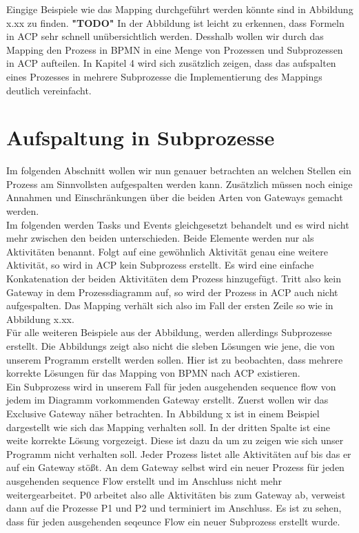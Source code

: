 Eingige Beispiele wie das Mapping durchgeführt werden könnte sind in Abbildung x.xx zu finden. \textbf{"TODO"}
In der Abbildung ist leicht zu erkennen, dass Formeln in ACP sehr schnell unübersichtlich werden. Desshalb wollen wir durch das Mapping den Prozess in BPMN in eine Menge von Prozessen und Subprozessen in ACP aufteilen. In Kapitel 4 wird sich zusätzlich zeigen, dass das aufspalten eines Prozesses in mehrere Subprozesse die Implementierung des Mappings deutlich vereinfacht.\\

\section {Aufspaltung in Subprozesse}
Im folgenden Abschnitt wollen wir nun genauer betrachten an welchen Stellen ein Prozess am Sinnvollsten aufgespalten werden kann. Zusätzlich müssen noch einige Annahmen und Einschränkungen über die beiden Arten von Gateways gemacht werden.\\
Im folgenden werden Tasks und Events gleichgesetzt behandelt und es wird nicht mehr zwischen den beiden unterschieden. Beide Elemente werden nur als Aktivitäten benannt. Folgt auf eine gewöhnlich Aktivität genau eine weitere Aktivität, so wird in ACP kein Subprozess erstellt. Es wird eine einfache Konkatenation der beiden Aktivitäten dem Prozess hinzugefügt. Tritt also kein Gateway in dem Prozessdiagramm auf, so wird der Prozess in ACP auch nicht aufgespalten. Das Mapping verhält sich also im Fall der ersten Zeile so wie in Abbildung x.xx.\\
Für alle weiteren Beispiele aus der Abbildung, werden allerdings Subprozesse erstellt. Die Abbildungs zeigt also nicht die sleben Lösungen wie jene, die von unserem Programm erstellt werden sollen. Hier ist zu beobachten, dass mehrere korrekte Lösungen für das Mapping von BPMN nach ACP existieren.\\
Ein Subprozess wird in unserem Fall für jeden ausgehenden sequence flow von jedem im Diagramm vorkommenden Gateway erstellt. Zuerst wollen wir das Exclusive Gateway näher betrachten. In Abbildung x ist in einem Beispiel dargestellt wie sich das Mapping verhalten soll. In der dritten Spalte ist eine weite korrekte Lösung vorgezeigt. Diese ist dazu da um zu zeigen wie sich unser Programm nicht verhalten soll. Jeder Prozess listet alle Aktivitäten auf bis das er auf ein Gateway stößt. An dem Gateway selbst wird ein neuer Prozess für jeden ausgehenden sequence Flow erstellt und im Anschluss nicht mehr weitergearbeitet. P0 arbeitet also alle Aktivitäten bis zum Gateway ab, verweist dann auf die Prozesse P1 und P2 und terminiert im Anschluss. Es ist zu sehen, dass für jeden ausgehenden seqeunce Flow ein neuer Subprozess erstellt wurde.\\ 
